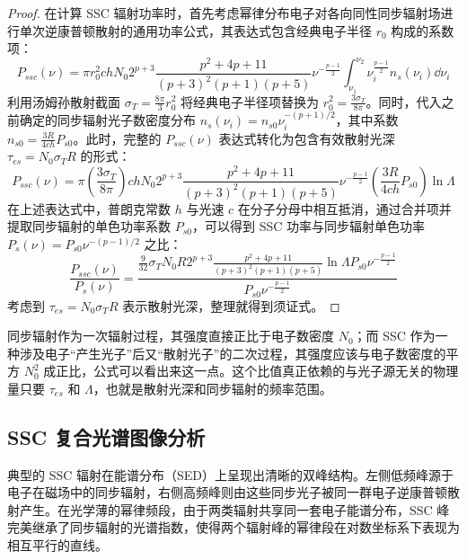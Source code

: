 \begin{proof}
    在计算 SSC 辐射功率时，首先考虑幂律分布电子对各向同性同步辐射场进行单次逆康普顿散射的通用功率公式，其表达式包含经典电子半径 $r_0$ 构成的系数项：
    \begin{equation}
        P_{ssc}(\nu) = \pi r_0^2 ch N_0 2^{p+3} \frac{p^2+4p+11}{(p+3)^2(p+1)(p+5)} \nu^{-\frac{p-1}{2}} \int_{\nu_1}^{\nu_2} \nu_i^{\frac{p-1}{2}} n_s(\nu_i) \dd{\nu_i}
    \end{equation}
    利用汤姆孙散射截面 $\sigma_T = \frac{8\pi}{3} r_0^2$ 将经典电子半径项替换为 $r_0^2 = \frac{3\sigma_T}{8\pi}$。同时，代入之前确定的同步辐射光子数密度分布 $n_s(\nu_i) = n_{s0} \nu_i^{-(p+1)/2}$，其中系数 $n_{s0} = \frac{3R}{4ch} P_{s0}$。此时，完整的 $P_{ssc}(\nu)$ 表达式转化为包含有效散射光深 $\tau_{es} = N_0 \sigma_T R$ 的形式：
    \begin{equation}
        P_{ssc}(\nu) = \pi \left( \frac{3\sigma_T}{8\pi} \right) ch N_0 2^{p+3} \frac{p^2+4p+11}{(p+3)^2(p+1)(p+5)} \nu^{-\frac{p-1}{2}} \left( \frac{3R}{4ch} P_{s0} \right) \ln \Lambda
    \end{equation}
    在上述表达式中，普朗克常数 $h$ 与光速 $c$ 在分子分母中相互抵消，通过合并项并提取同步辐射的单色功率系数 $P_{s0}$，可以得到 SSC 功率与同步辐射单色功率 $P_s(\nu) = P_{s0} \nu^{-(p-1)/2}$ 之比：
    \begin{equation}
        \frac{P_{ssc}(\nu)}{P_s(\nu)} = \frac{\frac{9}{32} \sigma_T N_0 R 2^{p+3} \frac{p^2+4p+11}{(p+3)^2(p+1)(p+5)} \ln \Lambda P_{s0} \nu^{-\frac{p-1}{2}}}{P_{s0} \nu^{-\frac{p-1}{2}}}
    \end{equation}
    考虑到 $\tau_{es} = N_0 \sigma_T R$ 表示散射光深，整理就得到须证式。
\end{proof}

同步辐射作为一次辐射过程，其强度直接正比于电子数密度 $N_0$；而 SSC 作为一种涉及电子“产生光子”后又“散射光子”的二次过程，其强度应该与电子数密度的平方 $N_0^2$ 成正比，公式可以看出来这一点。这个比值真正依赖的与光子源无关的物理量只要 $\tau_{es}$ 和 $\Lambda$，也就是散射光深和同步辐射的频率范围。

\subsection{SSC 复合光谱图像分析}

典型的 SSC 辐射在能谱分布（SED）上呈现出清晰的双峰结构。左侧低频峰源于电子在磁场中的同步辐射，右侧高频峰则由这些同步光子被同一群电子逆康普顿散射产生。在光学薄的幂律频段，由于两类辐射共享同一套电子能谱分布，SSC 峰完美继承了同步辐射的光谱指数，使得两个辐射峰的幂律段在对数坐标系下表现为相互平行的直线。



